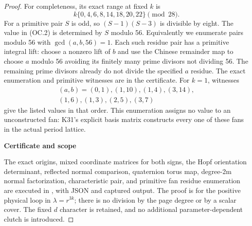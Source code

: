 \begin{proof}
For completeness, its exact range at fixed \(k\) is
\[
       k\{0,4,6,8,14,18,20,22\}\pmod {28}.
 \tag{OC.25}
\]
For a primitive pair \(S\) is odd, so \((S-1)(S-3)\) is divisible by eight.
The value in (OC.2) is determined by \(S\) modulo 56. Equivalently we
enumerate pairs modulo 56 with \(\gcd(a,b,56)=1\). Each such residue pair
has a primitive integral lift: choose a nonzero lift of \(b\) and use
the Chinese remainder map to choose \(a\) modulo 56 avoiding its finitely
many prime divisors not dividing 56. The remaining prime divisors
already do not divide the specified \(a\) residue. The exact enumeration
and primitive witnesses are in the certificate. For \(k=1\), witnesses
\[\begin{gathered}(a,b)=(0,1),(1,10),(1,4),(3,14),\\(1,6),(1,3),(2,5),(3,7)\end{gathered}\] give the
listed values in that order. This enumeration assigns no value to
an unconstructed fan: K31's explicit basis matrix constructs every
one of these fans in the actual period lattice.

\par

\medskip\noindent\textbf{Certificate and scope}

\par\nobreak

The exact origins, mixed coordinate matrices for both signs, the Hopf
orientation determinant, reflected normal comparison, quaternion
torus map, degree-2m normal factorization, characteristic pair, and
primitive fan residue enumeration are executed in
, with JSON and captured output.
The proof is for the positive physical loop in \(\lambda=r^{3k}\);
there is no division by the page degree or by a scalar cover. The
fixed \(d\) character is retained, and no additional parameter-dependent
clutch is introduced.

\end{proof}
